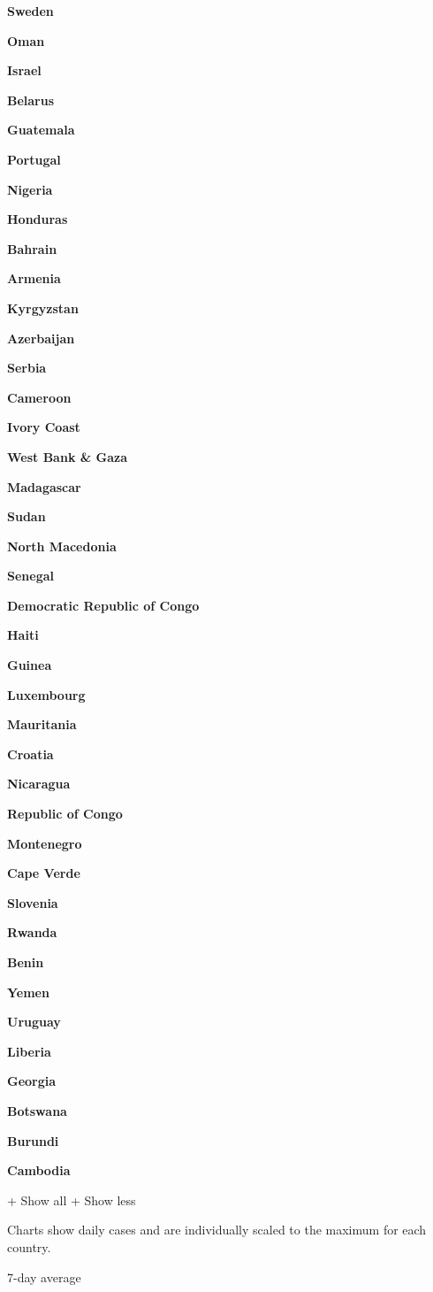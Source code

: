\textbf{Sweden}

\textbf{Oman}

\textbf{Israel}

\textbf{Belarus}

\textbf{Guatemala}

\textbf{Portugal}

\textbf{Nigeria}

\textbf{Honduras}

\textbf{Bahrain}

\textbf{Armenia}

\textbf{Kyrgyzstan}

\textbf{Azerbaijan}

\textbf{Serbia}

\textbf{Cameroon}

\textbf{Ivory Coast}

\textbf{West Bank \& Gaza}

\textbf{Madagascar}

\textbf{Sudan}

\textbf{North Macedonia}

\textbf{Senegal}

\textbf{Democratic Republic of Congo}

\textbf{Haiti}

\textbf{Guinea}

\textbf{Luxembourg}

\textbf{Mauritania}

\textbf{Croatia}

\textbf{Nicaragua}

\textbf{Republic of Congo}

\textbf{Montenegro}

\textbf{Cape Verde}

\textbf{Slovenia}

\textbf{Rwanda}

\textbf{Benin}

\textbf{Yemen}

\textbf{Uruguay}

\textbf{Liberia}

\textbf{Georgia}

\textbf{Botswana}

\textbf{Burundi}

\textbf{Cambodia}

+ Show all + Show less

Charts show daily cases and are individually scaled to the maximum for
each country.

7-day average

